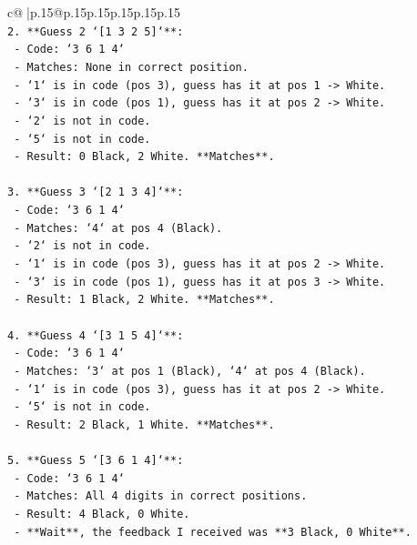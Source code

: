 \documentclass{article}
\begin{document}
{\begin{supertabular}{c@{$\;$}|p{.15\linewidth}@{}p{.15\linewidth}p{.15\linewidth}p{.15\linewidth}p{.15\linewidth}p{.15\linewidth}}
{{{\\ 
\texttt{2.  **Guess 2 `{[}1 3 2 5{]}`**:} \\
\texttt{    {-} Code: `3 6 1 4`} \\
\texttt{    {-} Matches: None in correct position.} \\
\texttt{    {-} `1` is in code (pos 3), guess has it at pos 1 {-}> White.} \\
\texttt{    {-} `3` is in code (pos 1), guess has it at pos 2 {-}> White.} \\
\texttt{    {-} `2` is not in code.} \\
\texttt{    {-} `5` is not in code.} \\
\texttt{    {-} Result: 0 Black, 2 White. **Matches**.} \\
\\ 
\texttt{3.  **Guess 3 `{[}2 1 3 4{]}`**:} \\
\texttt{    {-} Code: `3 6 1 4`} \\
\texttt{    {-} Matches: `4` at pos 4 (Black).} \\
\texttt{    {-} `2` is not in code.} \\
\texttt{    {-} `1` is in code (pos 3), guess has it at pos 2 {-}> White.} \\
\texttt{    {-} `3` is in code (pos 1), guess has it at pos 3 {-}> White.} \\
\texttt{    {-} Result: 1 Black, 2 White. **Matches**.} \\
\\ 
\texttt{4.  **Guess 4 `{[}3 1 5 4{]}`**:} \\
\texttt{    {-} Code: `3 6 1 4`} \\
\texttt{    {-} Matches: `3` at pos 1 (Black), `4` at pos 4 (Black).} \\
\texttt{    {-} `1` is in code (pos 3), guess has it at pos 2 {-}> White.} \\
\texttt{    {-} `5` is not in code.} \\
\texttt{    {-} Result: 2 Black, 1 White. **Matches**.} \\
\\ 
\texttt{5.  **Guess 5 `{[}3 6 1 4{]}`**:} \\
\texttt{    {-} Code: `3 6 1 4`} \\
\texttt{    {-} Matches: All 4 digits in correct positions.} \\
\texttt{    {-} Result: 4 Black, 0 White.} \\
\texttt{    {-} **Wait**, the feedback I received was **3 Black, 0 White**.} \\
}}}
\end{supertabular}}
\end{document}
